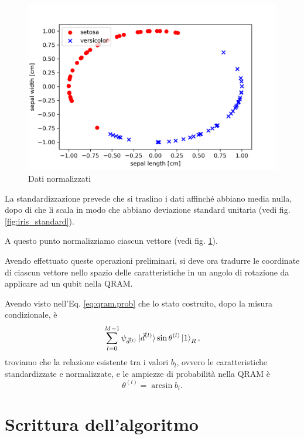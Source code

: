 \begin{figure}[h]
    \centering
    \includegraphics[width=\linewidth]{gfx/iris/iris2normalized}
    \caption{Dati normalizzati}
    \label{fig:iris_normal}
\end{figure}

La standardizzazione prevede che si traslino i dati affinché abbiano media nulla, 
dopo di che li scala in modo che abbiano deviazione standard unitaria 
(vedi fig. \ref{fig:iris_standard}). 

A questo punto normalizziamo ciascun vettore (vedi fig. \ref{fig:iris_normal}). 

Avendo effettuato queste operazioni preliminari, si deve ora tradurre le coordinate 
di ciascun vettore nello spazio delle caratteristiche in un angolo di rotazione 
da applicare ad un qubit nella \ac{QRAM}. 

Avendo visto nell'Eq. \ref{eq:qram.prob} che lo stato costruito, dopo la misura condizionale, è 
\begin{equation}
    \sum_{l=0}^{M-1} \psi_{\vec{d}^{(l)}}\ket{\vec{d}^{(l)}}\sin\theta^{(l)}\ket{1}_R,
\end{equation}
troviamo che la relazione esistente tra i valori $b_l$, ovvero le caratteristiche standardizzate e normalizzate, 
e le ampiezze di probabilità nella \ac{QRAM} è 
\begin{equation}
    \theta^{(l)} = \arcsin b_l. 
\end{equation}

\section{Scrittura dell'algoritmo}

